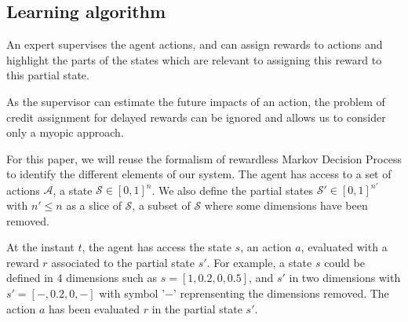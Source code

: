 \documentclass[letterpaper]{article} %
\begin{document}

\subsection{Learning algorithm}

An expert supervises the agent actions, and can assign rewards to actions and
highlight the parts of the states which are relevant to assigning this reward to
this partial state.

As the supervisor can estimate the future impacts of an action, the problem of
credit assignment for delayed rewards can be ignored  and allows us to consider
only a myopic approach. 

For this paper, we will reuse the formalism of rewardless Markov Decision 
Process to identify the different elements of our system. The agent has access
to a set of actions $\mathcal{A}$, a state $\mathcal{S} \in [0,1]^{n}$. We
also define the partial states $\mathcal{S'} \in [0,1]^{n'}$ with $n' \leq n$ as a
slice of $\mathcal{S}$, a subset of $\mathcal{S}$ where some dimensions have
been removed. 

At the instant $t$, the agent has access the state $s$, an action $a$, evaluated
with a reward $r$ associated to the partial state $s'$. For example, a state $s$ could be
defined in 4 dimensions such as ${s=[1,0.2,0,0.5]}$, and $s'$ in two dimensions with
${s'=[-,0.2,0,-]}$ with symbol '$-$' reprensenting the dimensions removed. The
action $a$ has been evaluated $r$ in the partial state $s'$. 
\end{document}

